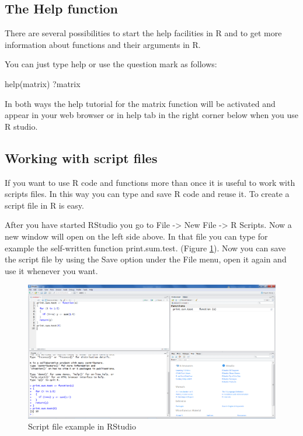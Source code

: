 \documentclass[]{book}
\begin{document}
\subsection{The Help function}\label{the-help-function}

There are several possibilities to start the help facilities in R and to
get more information about functions and their arguments in R.

You can just type help or use the question mark as follows:

help(matrix) ?matrix

In both ways the help tutorial for the matrix function will be activated
and appear in your web browser or in help tab in the right corner below
when you use R studio.

\subsection{Working with script files}\label{working-with-script-files}

If you want to use R code and functions more than once it is useful to
work with scripts files. In this way you can type and save R code and
reuse it. To create a script file in R is easy.

After you have started RStudio you go to File -\textgreater{} New File
-\textgreater{} R Scripts. Now a new window will open on the left side
above. In that file you can type for example the self-written function
print.sum.test. (Figure \ref{fig:fig11}). Now you can save the script
file by using the Save option under the File menu, open it again and use
it whenever you want.

\begin{figure}

{\centering \includegraphics[width=0.9\linewidth]{images/fig1.11} 

}

\caption{Script file example in RStudio}\label{fig:fig11}
\end{figure}
\end{document}
